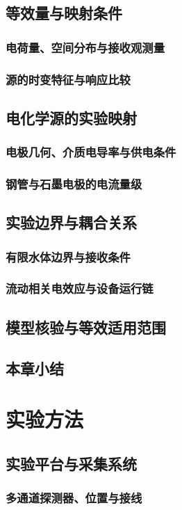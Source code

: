 \section{等效量与映射条件}
\subsection{电荷量、空间分布与接收观测量}
\subsection{源的时变特征与响应比较}
\section{电化学源的实验映射}
\subsection{电极几何、介质电导率与供电条件}
\subsection{钢管与石墨电极的电流量级}
\section{实验边界与耦合关系}
\subsection{有限水体边界与接收条件}
\subsection{流动相关电效应与设备运行链}
\section{模型核验与等效适用范围}
\section{本章小结}

\chapter{实验方法}
\section{实验平台与采集系统}
\subsection{多通道探测器、位置与接线}
